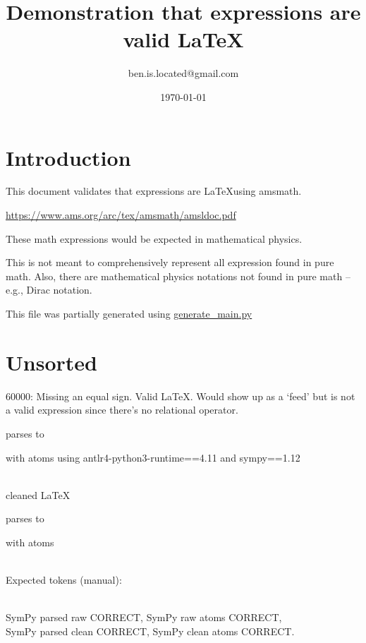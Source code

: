 \documentclass{article}
\title{Demonstration that expressions are valid \LaTeX}
\author{ben.is.located@gmail.com}
\date{\today}
\begin{document}
\maketitle

\section{Introduction}
This document validates that expressions are \LaTeX using amsmath. 

\href{https://www.ams.org/arc/tex/amsmath/amsldoc.pdf}{https://www.ams.org/arc/tex/amsmath/amsldoc.pdf}

These math expressions would be expected in mathematical physics.

This is not meant to comprehensively represent all expression found in pure math. Also, there are mathematical physics notations not found in pure math -- e.g., Dirac notation.

This file was partially generated using
\href{https://github.com/allofphysicsgraph/latex-example-expressions/blob/master/generate_main.py}{generate\_main.py}

\section{Unsorted}

60000: 
Missing an equal sign. Valid \LaTeX. Would show up as a `feed' but is not a valid expression since there's no relational operator.

parses to

with atoms
using antlr4-python3-runtime==4.11 and sympy==1.12

\ \\
cleaned \LaTeX

parses to

with atoms


\ \\
Expected tokens (manual):


\ \\
SymPy parsed raw CORRECT, 
SymPy raw atoms CORRECT, \\
SymPy parsed clean CORRECT, 
SymPy clean atoms CORRECT.
\end{document}
